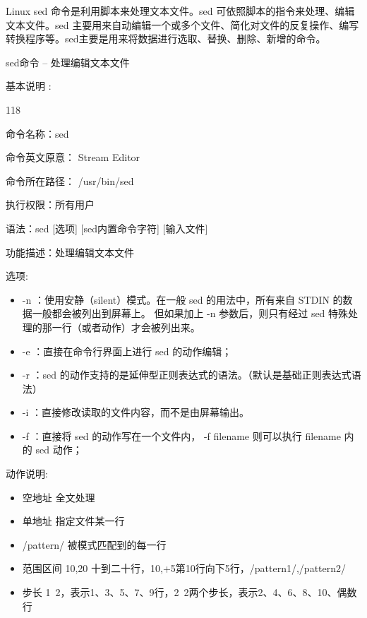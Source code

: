 Linux sed 命令是利用脚本来处理文本文件。sed 可依照脚本的指令来处理、编辑文本文件。sed 主要用来自动编辑一个或多个文件、简化对文件的反复操作、编写转换程序等。sed主要是用来将数据进行选取、替换、删除、新增的命令。
\begin{ascolorbox5}{sed命令 – 处理编辑文本文件}
	\begin{ascboxE}{基本说明 :}
		\begin{dinglist}{118}
			\item 命令名称：sed
			\item 命令英文原意： Stream Editor
			\item 命令所在路径： /usr/bin/sed
			\item 执行权限：所有用户 
			\item 语法：sed [选项] [sed内置命令字符] [输入文件]
			\item 功能描述：处理编辑文本文件
		\end{dinglist}
	\end{ascboxE}
	\begin{ascboxB}{选项:}
		\begin{itemize}
			\item -n ：使用安静（silent）模式。在一般 sed 的用法中，所有来自 STDIN 的数据一般都会被列出到屏幕上。
			但如果加上 -n 参数后，则只有经过 sed 特殊处理的那一行（或者动作）才会被列出来。
			\item -e ：直接在命令行界面上进行 sed 的动作编辑；
			\item -r ：sed 的动作支持的是延伸型正则表达式的语法。（默认是基础正则表达式语法）
			\item -i ：直接修改读取的文件内容，而不是由屏幕输出。
			\item -f ：直接将 sed 的动作写在一个文件内， -f filename 则可以执行 filename 内的 sed 动作；
		\end{itemize}
	\end{ascboxB}
\begin{ascboxB}{动作说明:}
	\begin{itemize}
		\item 空地址	全文处理
		\item 单地址	指定文件某一行
		\item /pattern/	被模式匹配到的每一行
		\item 范围区间	10,20 十到二十行，10,+5第10行向下5行，/pattern1/,/pattern2/
	\item 	步长	1~2，表示1、3、5、7、9行，2~2两个步长，表示2、4、6、8、10、偶数行
	\end{itemize}
\end{ascboxB}


\end{ascolorbox5}
